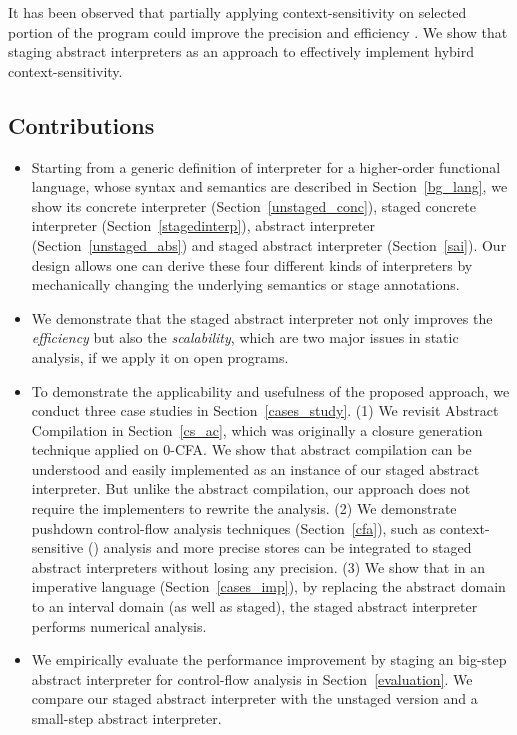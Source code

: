 It has been observed that partially applying context-sensitivity on selected portion of the program could
improve the precision and efficiency \cite{zipper2018, Kastrinis:2013:HCP:2491956.2462191}.
We show that staging abstract interpreters as an approach to effectively implement hybird context-sensitivity\todo{}.


\subsection{Contributions}

\begin{itemize}
  \item Starting from a generic definition of interpreter for a higher-order functional language,
    whose syntax and semantics are described in Section~\ref{bg_lang}, we show its concrete
    interpreter (Section~\ref{unstaged_conc}), staged concrete interpreter (Section~\ref{stagedinterp}), 
    abstract interpreter (Section~\ref{unstaged_abs}) and staged abstract interpreter (Section~\ref{sai}).
    Our design allows one can derive these four different kinds of interpreters by mechanically changing
    the underlying semantics or stage annotations.
  \item We demonstrate that the staged abstract interpreter not only improves the \textit{efficiency}
    but also the \textit{scalability}, which are two major issues in static analysis, if we apply it on open
    programs. 
  \item To demonstrate the applicability and usefulness of the proposed approach, we conduct three case studies 
    in Section~\ref{cases_study}. 
    \subitem (1) We revisit Abstract Compilation \cite{Boucher:1996:ACN:647473.727587} in Section~\ref{cs_ac}, 
    which was originally a closure generation technique applied on 0-CFA.
    We show that abstract compilation can be understood and easily implemented as an instance of our staged abstract interpreter.
    But unlike the abstract compilation, our approach does not require the implementers to rewrite the analysis.
    \subitem (2) We demonstrate pushdown control-flow analysis techniques (Section~\ref{cfa}), such as context-sensitive 
    ()
    analysis and more precise stores can be integrated to staged abstract interpreters without losing any precision.
    \subitem (3) We show that in an imperative language (Section~\ref{cases_imp}), by replacing the abstract domain
    to an interval domain (as well as staged), the staged abstract interpreter performs numerical analysis.
  \item We empirically evaluate the performance improvement by staging an big-step abstract interpreter 
    for control-flow analysis in Section~\ref{evaluation}. 
    We compare our staged abstract interpreter with the unstaged version and a small-step abstract interpreter.
\end{itemize}
